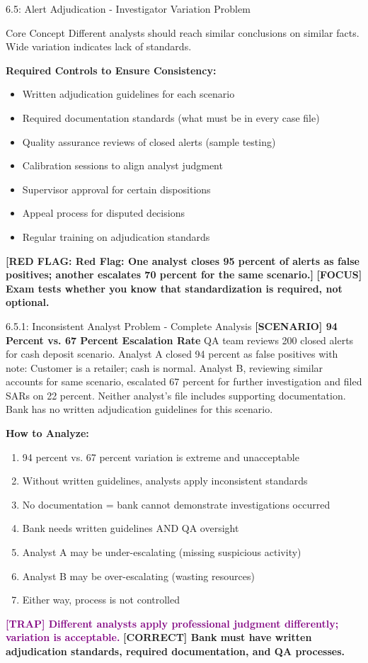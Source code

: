 \documentclass[11pt,a4paper]{beamer}
\newcommand{\examfocus}[1]{\textcolor{orange!80!black}{\textbf{[FOCUS] #1}}}
\newcommand{\trap}[1]{\textcolor{purple}{\textbf{[TRAP] #1}}}
\newcommand{\correct}[1]{\textcolor{green!50!black}{\textbf{[CORRECT] #1}}}
\newcommand{\scenario}[1]{\textcolor{blue!70!black}{\textbf{[SCENARIO] #1}}}
\newcommand{\redflag}[1]{\textcolor{red!80!black}{\textbf{[RED FLAG: #1]}}}
\begin{document}
\begin{frame}{6.5: Alert Adjudication - Investigator Variation Problem}
	\begin{block}{Core Concept}
		Different analysts should reach similar conclusions on similar facts. Wide variation indicates lack of standards.
	\end{block}
	\textbf{Required Controls to Ensure Consistency:}
	\begin{itemize}
		\item Written adjudication guidelines for each scenario
		\item Required documentation standards (what must be in every case file)
		\item Quality assurance reviews of closed alerts (sample testing)
		\item Calibration sessions to align analyst judgment
		\item Supervisor approval for certain dispositions
		\item Appeal process for disputed decisions
		\item Regular training on adjudication standards
	\end{itemize}
	\redflag{Red Flag: One analyst closes 95 percent of alerts as false positives; another escalates 70 percent for the same scenario.}
	\examfocus{Exam tests whether you know that standardization is required, not optional.}
\end{frame}

\begin{frame}{6.5.1: Inconsistent Analyst Problem - Complete Analysis}
	\scenario{94 Percent vs. 67 Percent Escalation Rate}
	QA team reviews 200 closed alerts for cash deposit scenario. Analyst A closed 94 percent as false positives with note: Customer is a retailer; cash is normal. Analyst B, reviewing similar accounts for same scenario, escalated 67 percent for further investigation and filed SARs on 22 percent. Neither analyst's file includes supporting documentation. Bank has no written adjudication guidelines for this scenario.
	
	\vspace{0.1cm}
	\textbf{How to Analyze:}
	\begin{enumerate}
		\item 94 percent vs. 67 percent variation is extreme and unacceptable
		\item Without written guidelines, analysts apply inconsistent standards
		\item No documentation = bank cannot demonstrate investigations occurred
		\item Bank needs written guidelines AND QA oversight
		\item Analyst A may be under-escalating (missing suspicious activity)
		\item Analyst B may be over-escalating (wasting resources)
		\item Either way, process is not controlled
	\end{enumerate}
	\trap{Different analysts apply professional judgment differently; variation is acceptable.}
	\correct{Bank must have written adjudication standards, required documentation, and QA processes.}
\end{frame}
\end{document}
